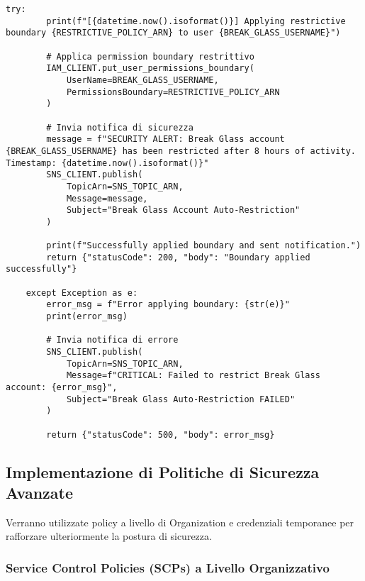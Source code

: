 \begin{enumerate}
\begin{lstlisting}[style=python, caption={Esempio Lambda per limitare utente Break Glass (concettuale)}, label=lst:breakglass-lambda]
    try:
        print(f"[{datetime.now().isoformat()}] Applying restrictive boundary {RESTRICTIVE_POLICY_ARN} to user {BREAK_GLASS_USERNAME}")
        
        # Applica permission boundary restrittivo
        IAM_CLIENT.put_user_permissions_boundary(
            UserName=BREAK_GLASS_USERNAME,
            PermissionsBoundary=RESTRICTIVE_POLICY_ARN
        )
        
        # Invia notifica di sicurezza
        message = f"SECURITY ALERT: Break Glass account {BREAK_GLASS_USERNAME} has been restricted after 8 hours of activity. Timestamp: {datetime.now().isoformat()}"
        SNS_CLIENT.publish(
            TopicArn=SNS_TOPIC_ARN,
            Message=message,
            Subject="Break Glass Account Auto-Restriction"
        )
        
        print(f"Successfully applied boundary and sent notification.")
        return {"statusCode": 200, "body": "Boundary applied successfully"}
        
    except Exception as e:
        error_msg = f"Error applying boundary: {str(e)}"
        print(error_msg)
        
        # Invia notifica di errore
        SNS_CLIENT.publish(
            TopicArn=SNS_TOPIC_ARN,
            Message=f"CRITICAL: Failed to restrict Break Glass account: {error_msg}",
            Subject="Break Glass Auto-Restriction FAILED"
        )
        
        return {"statusCode": 500, "body": error_msg}
    \end{lstlisting}
\end{enumerate}

\subsection{Implementazione di Politiche di Sicurezza Avanzate}

Verranno utilizzate policy a livello di Organization e credenziali temporanee per rafforzare ulteriormente la postura di sicurezza.

\subsubsection{Service Control Policies (SCPs) a Livello Organizzativo}

